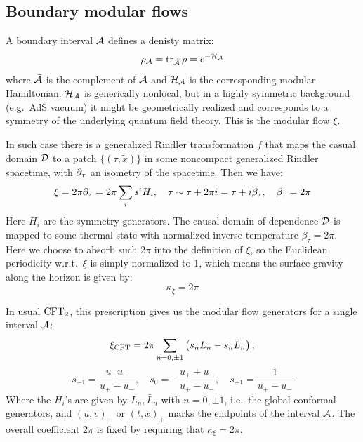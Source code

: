 \documentclass[11pt,a4paper,utf8]{article}
\begin{document}
	
\pagebreak
\subsection{Boundary modular flows}

	A boundary interval $\mathcal{A}$ defines a denisty matrix:
	\begin{equation}
		\rho_{\mathcal{A}}
		= \operatorname{tr}_{\bar{\mathcal{A}}} \rho
		= e^{-\mathcal{H}_{\mathcal{A}}}
	\end{equation}
	where $\bar{\mathcal{A}}$ is the complement of $\mathcal{A}$ and $\mathcal{H}_{\mathcal{A}}$ is the corresponding modular Hamiltonian. $\mathcal{H}_{\mathcal{A}}$ is generically nonlocal, but in a highly symmetric background (e.g.~AdS vacuum) it might be geometrically realized and corresponds to a symmetry of the underlying quantum field theory. This is the modular flow $\xi$. 
	
	In such case there is a generalized Rindler transformation $f$ that maps the casual domain $\mathcal{D}$ to a patch $\{(\tau,\tilde{x})\}$ in some noncompact generalized Rindler spacetime, with $\partial_{\tau}$ an isometry of the spacetime. Then we have:
	\begin{equation}
		\xi = 2\pi \partial_{\tau}
		= 2\pi \sum_i s^i H_i,
	\quad
		\tau \sim \tau + 2\pi i
		= \tau + i\beta_\tau,
	\quad
		\beta_\tau = 2\pi
	\end{equation}
	Here $H_i$ are the symmetry generators. The causal domain of dependence $\mathcal{D}$ is mapped to some thermal state with normalized inverse temperature $\beta_\tau = 2\pi$. Here we choose to absorb such $2\pi$ into the definition of $\xi$, so the Euclidean periodicity w.r.t.~$\xi$ is simply normalized to 1, which means the surface gravity along the horizon is given by:
	\begin{equation}
		\kappa_\xi = 2\pi
	\end{equation}
	
	In usual $\mathrm{CFT}_2$, this prescription gives us the modular flow generators for a single interval $\mathcal{A}$:
	\begin{equation}
		\xi_{\mathrm{CFT}} = 2\pi \sum_{n=0,\pm 1} \left(
				s_n L_n - \bar{s}_n \bar{L}_n
			\right),
	\end{equation}
	\begin{equation}
		s_{-1} = \frac{u_+ u_-}{u_+ - u_-},\quad
		s_0 = - \frac{u_+ + u_-}{u_+ - u_-},\quad
		s_{+1} = \frac{1}{u_+ - u_-}
	\end{equation}
	Where the $H_i$'s are given by $L_n,\bar{L}_n$ with $n=0,\pm 1$, i.e.~the global conformal generators, and $(u,v)_\pm$ or $(t,x)_\pm$ marks the endpoints of the interval $\mathcal{A}$. The overall coefficient $2\pi$ is fixed by requiring that $\kappa_\xi = 2\pi$. 
	
\end{document}
